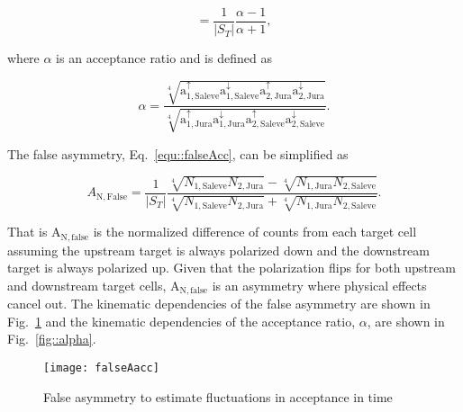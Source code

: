 \begin{equation}
  \label{equ::alphaAsym}
 = \frac{1}{|S_T|}
  \frac{
    \alpha - 1     
  }{
    \alpha + 1
  },
\end{equation}

\noindent
where $\alpha$ is an acceptance ratio and is defined as

\begin{equation} \label{equ::alphaAcc}
  \alpha = \frac{ \sqrt[4]{ \mathrm{a}^{\uparrow}_{\mathrm{1,Saleve}}
      \mathrm{a}^{\downarrow}_{\mathrm{1,Saleve}}
      \mathrm{a}^{\uparrow}_{\mathrm{2,Jura}}
      \mathrm{a}^{\downarrow}_{\mathrm{2,Jura}}} }{ \sqrt[4]{
      \mathrm{a}^{\uparrow}_{\mathrm{1,Jura}}
      \mathrm{a}^{\downarrow}_{\mathrm{1,Jura}}
      \mathrm{a}^{\uparrow}_{\mathrm{2,Saleve}}
      \mathrm{a}^{\downarrow}_{\mathrm{2,Saleve}}} }.
\end{equation}

\noindent
The false asymmetry, Eq.~\ref{equ::falseAcc}, can be simplified as

\begin{equation}
  A_{\mathrm{N,False}} = 
  \frac{1}{|S_T|}
  \frac{
    \sqrt[4]{
      N_{\mathrm{1, Saleve}}
      N_{\mathrm{2, Jura}}
    } -
    \sqrt[4]{
      N_{\mathrm{1, Jura}}
      N_{\mathrm{2, Saleve}}
    }
  }{
    \sqrt[4]{
      N_{\mathrm{1, Saleve}}
      N_{\mathrm{2, Jura}}
    } +
    \sqrt[4]{
      N_{\mathrm{1, Jura}}
      N_{\mathrm{2, Saleve}}
    }
  }.
\end{equation}

\noindent
That is A$_{\mathrm{N,false}}$ is the normalized difference of counts from each
target cell assuming the upstream target is always polarized down and the
downstream target is always polarized up.  Given that the polarization flips for
both upstream and downstream target cells, A$_{\mathrm{N,false}}$ is an
asymmetry where physical effects cancel out.  The kinematic dependencies of the
false asymmetry are shown in Fig.~\ref{fig::falseAacc} and the kinematic
dependencies of the acceptance ratio, $\alpha$, are shown in
Fig.~\ref{fig::alpha}.

\begin{figure}[h!t]
  \begin{center}
    \texttt{[image: falseAacc]}
    \caption{False asymmetry to estimate fluctuations in acceptance in time}
    \label{fig::falseAacc}
  \end{center}
\end{figure}

